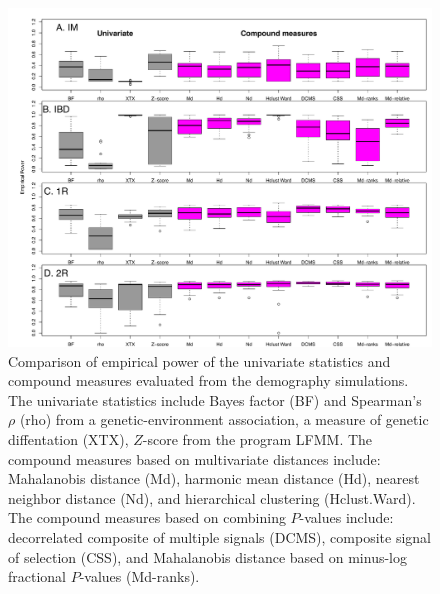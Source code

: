 \documentclass[12pt, oneside]{amsart}
\begin{document}
\newpage
\begin{figure}[h]
\begin{center}
\includegraphics[width=6in]{../figures_man2/F4-LandsharcSummary2.pdf}
\end{center}
\caption[]{Comparison of empirical power of the univariate statistics and compound measures evaluated from the demography simulations. The univariate statistics include Bayes factor (BF) and Spearman's $\rho$ (rho) from a genetic-environment association, a measure of genetic diffentation (XTX), $Z$-score from the program LFMM.
The compound measures based on multivariate distances include: Mahalanobis distance (Md), harmonic mean distance (Hd), nearest neighbor distance (Nd), and hierarchical clustering (Hclust.Ward). The compound measures based on combining $P$-values include: decorrelated composite of multiple signals (DCMS), composite signal of selection (CSS), and Mahalanobis distance based on minus-log fractional $P$-values (Md-ranks).}
 \label{fig:???}
\end{figure}
\end{document}
